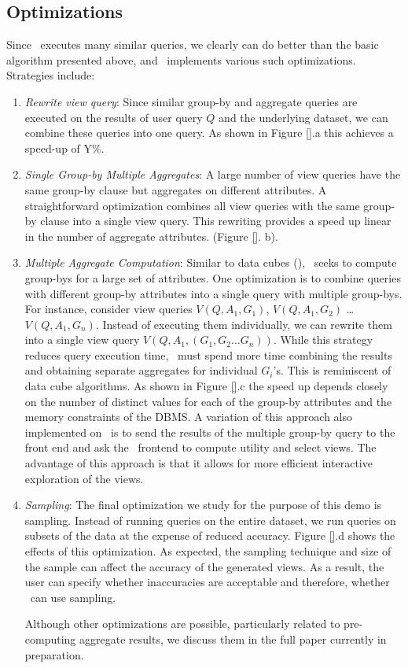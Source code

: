 \subsection{Optimizations}
\label{optimizations}

Since \SeeDB\ executes many similar queries, we clearly can do better than
the basic algorithm presented above, and \SeeDB\ implements various such
optimizations. Strategies include:

\begin{enumerate}
  \item {\it Rewrite view query}: Since similar group-by and aggregate queries
  are executed on the results of user query $Q$ and the underlying dataset, we
  can combine these queries into one query. As shown in Figure \ref{}.a this
  achieves a speed-up of Y\%.
  \item {\it Single Group-by Multiple Aggregates}: A large number of view
  queries have the same group-by clause but aggregates on different attributes.
  A straightforward optimization combines all view queries with the same
  group-by clause into a single view query. This rewriting provides a speed up
  linear in the number of aggregate attributes. (Figure \ref{}. b).
  \item {\it Multiple Aggregate Computation}: Similar to data cubes (\cite{}),
  \SeeDB\ seeks to compute group-bys for a large set of attributes. One
  optimization is to combine queries with different group-by attributes into a
  single query with multiple group-bys. For instance, consider view queries
  $V(Q, A_1, G_1)$, $V(Q, A_1, G_2)$ \ldots $V(Q, A_1, G_n)$. Instead of
  executing them individually, we can rewrite them into a single view query
  $V(Q, A_1, (G_1, G_2\ldots G_n))$. While this strategy reduces query
  execution time, \SeeDB\ must spend more time combining the results and
  obtaining separate aggregates for individual $G_i$'s. This is reminiscent of
  data cube algorithms. As shown in Figure \ref{}.c the speed up depends closely
  on the number of distinct values for each of the group-by attributes and the
  memory constraints of the DBMS. A variation of this approach also implemented
  on \SeeDB\ is to send the results of the multiple group-by query to the front
  end and ask the \SeeDB\ frontend to compute utility and select views. The
  advantage of this approach is that it allows for more efficient interactive
  exploration of the views.
  \item {\it Sampling}: The final optimization we study for the purpose of this
  demo is sampling. Instead of running queries on the entire dataset, we
  run queries on subsets of the data at the expense of reduced accuracy.
  Figure \ref{}.d shows the effects of this optimization. As expected, the
  sampling technique and size of the sample can affect the accuracy of the
  generated views. As a result, the user can specify whether inaccuracies are
  acceptable and therefore, whether \SeeDB\ can use sampling.
  
  Although other optimizations are possible, particularly related to
  pre-computing aggregate results, we discuss them in the full paper currently
  in preparation.
\end{enumerate}

